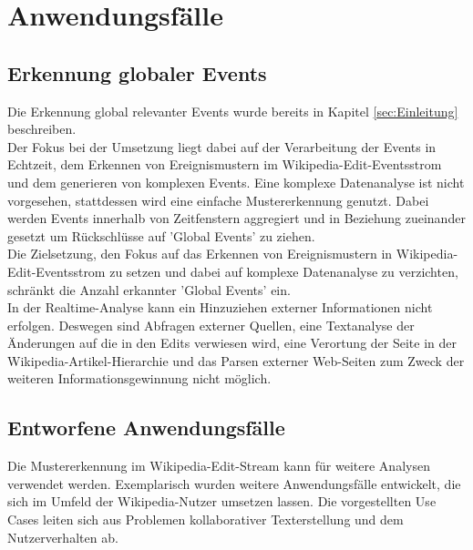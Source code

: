 \section{Anwendungsfälle}
\subsection{Erkennung globaler Events}
Die Erkennung global relevanter Events wurde bereits in Kapitel \ref{sec:Einleitung} beschreiben.\\

Der Fokus bei der Umsetzung liegt dabei auf der Verarbeitung der Events in Echtzeit, dem Erkennen von Ereignismustern im Wikipedia-Edit-Eventsstrom und dem generieren von komplexen Events. Eine komplexe Datenanalyse ist nicht vorgesehen, stattdessen wird eine einfache Mustererkennung genutzt. Dabei werden Events innerhalb von Zeitfenstern aggregiert und in Beziehung zueinander gesetzt um Rückschlüsse auf 'Global Events' zu ziehen.\\

Die Zielsetzung, den Fokus auf das Erkennen von Ereignismustern in Wikipedia-Edit-Eventsstrom zu setzen und dabei auf komplexe Datenanalyse zu verzichten, schränkt die Anzahl erkannter 'Global Events' ein.\\

In der Realtime-Analyse kann ein Hinzuziehen externer Informationen nicht erfolgen. Deswegen sind Abfragen externer Quellen, eine Textanalyse der Änderungen auf die in den Edits verwiesen wird, eine Verortung der Seite in der Wikipedia-Artikel-Hierarchie und das Parsen externer Web-Seiten zum Zweck der weiteren Informationsgewinnung nicht möglich.



\subsection{Entworfene Anwendungsfälle}
Die Mustererkennung im Wikipedia-Edit-Stream kann für weitere Analysen verwendet werden. Exemplarisch wurden weitere Anwendungsfälle entwickelt, die sich im Umfeld der Wikipedia-Nutzer umsetzen lassen. Die vorgestellten Use Cases leiten sich aus Problemen kollaborativer Texterstellung und dem Nutzerverhalten ab.

